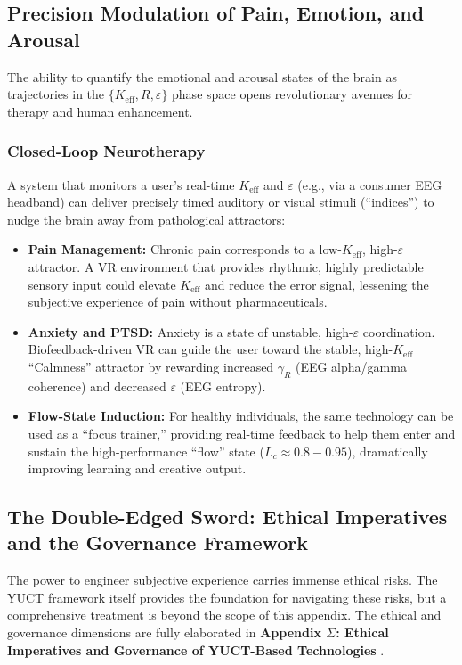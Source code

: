 \documentclass[12pt,a4paper]{article}
\begin{document}
	\subsection{Precision Modulation of Pain, Emotion, and Arousal}
	
	The ability to quantify the emotional and arousal states of the brain as trajectories in the \(\{K_{\mathrm{eff}}, R, \varepsilon\}\) phase space opens revolutionary avenues for therapy and human enhancement.
	
	\subsubsection{Closed-Loop Neurotherapy}
	A system that monitors a user's real-time \(K_{\mathrm{eff}}\) and \(\varepsilon\) (e.g., via a consumer EEG headband) can deliver precisely timed auditory or visual stimuli (``indices'') to nudge the brain away from pathological attractors:
	\begin{itemize}
		\item \textbf{Pain Management:} Chronic pain corresponds to a low-\(K_{\mathrm{eff}}\), high-\(\varepsilon\) attractor. A VR environment that provides rhythmic, highly predictable sensory input could elevate \(K_{\mathrm{eff}}\) and reduce the error signal, lessening the subjective experience of pain without pharmaceuticals.
		\item \textbf{Anxiety and PTSD:} Anxiety is a state of unstable, high-\(\varepsilon\) coordination. Biofeedback-driven VR can guide the user toward the stable, high-\(K_{\mathrm{eff}}\) ``Calmness'' attractor by rewarding increased \(\gamma_R\) (EEG alpha/gamma coherence) and decreased \(\varepsilon\) (EEG entropy).
		\item \textbf{Flow-State Induction:} For healthy individuals, the same technology can be used as a ``focus trainer,'' providing real-time feedback to help them enter and sustain the high-performance ``flow'' state (\(L_c \approx 0.8-0.95\)), dramatically improving learning and creative output.
	\end{itemize}
	
	\subsection{The Double-Edged Sword: Ethical Imperatives and the Governance Framework}
	
	The power to engineer subjective experience carries immense ethical risks. The YUCT framework itself provides the foundation for navigating these risks, but a comprehensive treatment is beyond the scope of this appendix. The ethical and governance dimensions are fully elaborated in \textbf{Appendix \(\Sigma\): Ethical Imperatives and Governance of YUCT-Based Technologies} \cite{AppendixSigma}. 
	
\end{document}
